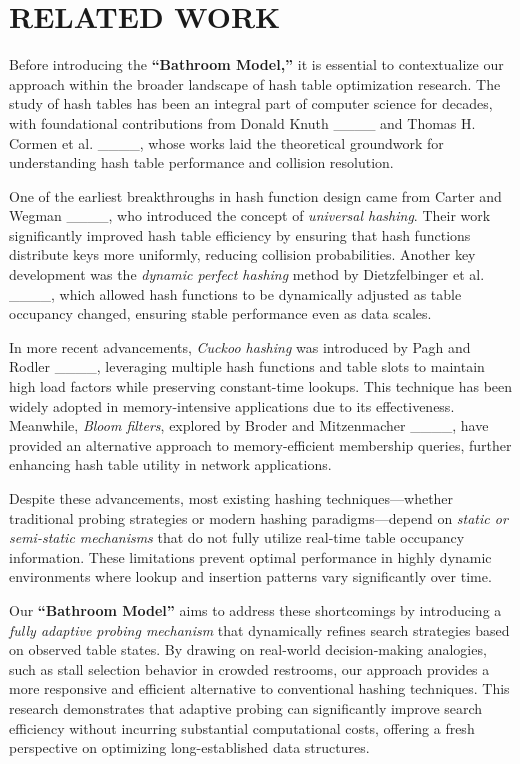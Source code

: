 \section{RELATED WORK}
Before introducing the \textbf{``Bathroom Model,''} it is essential to contextualize our approach within the broader landscape of hash table optimization research. The study of hash tables has been an integral part of computer science for decades, with foundational contributions from Donald Knuth ____ and Thomas H. Cormen et al. ____, whose works laid the theoretical groundwork for understanding hash table performance and collision resolution.

One of the earliest breakthroughs in hash function design came from Carter and Wegman ____, who introduced the concept of \textit{universal hashing}. Their work significantly improved hash table efficiency by ensuring that hash functions distribute keys more uniformly, reducing collision probabilities. Another key development was the \textit{dynamic perfect hashing} method by Dietzfelbinger et al. ____, which allowed hash functions to be dynamically adjusted as table occupancy changed, ensuring stable performance even as data scales.

In more recent advancements, \textit{Cuckoo hashing} was introduced by Pagh and Rodler ____, leveraging multiple hash functions and table slots to maintain high load factors while preserving constant-time lookups. This technique has been widely adopted in memory-intensive applications due to its effectiveness. Meanwhile, \textit{Bloom filters}, explored by Broder and Mitzenmacher ____, have provided an alternative approach to memory-efficient membership queries, further enhancing hash table utility in network applications.

Despite these advancements, most existing hashing techniques—whether traditional probing strategies or modern hashing paradigms—depend on \textit{static or semi-static mechanisms} that do not fully utilize real-time table occupancy information. These limitations prevent optimal performance in highly dynamic environments where lookup and insertion patterns vary significantly over time.

Our \textbf{``Bathroom Model''} aims to address these shortcomings by introducing a \textit{fully adaptive probing mechanism} that dynamically refines search strategies based on observed table states. By drawing on real-world decision-making analogies, such as stall selection behavior in crowded restrooms, our approach provides a more responsive and efficient alternative to conventional hashing techniques. This research demonstrates that adaptive probing can significantly improve search efficiency without incurring substantial computational costs, offering a fresh perspective on optimizing long-established data structures.
